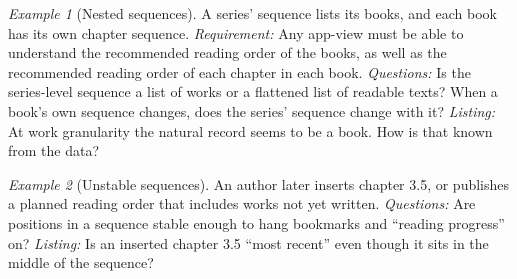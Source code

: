 \documentclass{amsart}
\theoremstyle{remark}
\newtheorem{eg}{Example}
\begin{document}
    \begin{eg}[Nested sequences]\label{eg:nested-sequences}
        A series' sequence lists its books, and each book has its own chapter sequence.
        \emph{Requirement:} Any app-view must be able to understand the recommended reading order of the books, as well as the recommended reading order of each chapter in each book.
        \emph{Questions:} Is the series-level sequence a list of works or a flattened list of readable texts? When a book's own sequence changes, does the series' sequence change with it?
        \emph{Listing:} At work granularity the natural record seems to be a book. How is that known from the data?
    \end{eg}
    \begin{eg}[Unstable sequences]\label{eg:unstable}
        An author later inserts chapter 3.5, or publishes a planned reading order that includes works not yet written.
        \emph{Questions:} Are positions in a sequence stable enough to hang bookmarks and ``reading progress'' on?
        \emph{Listing:} Is an inserted chapter 3.5 ``most recent'' even though it sits in the middle of the sequence?
    \end{eg}
\end{document}
